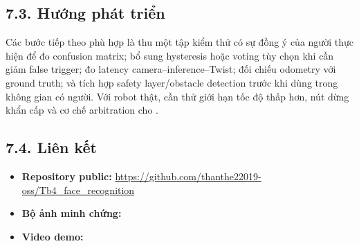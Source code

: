 \subsection*{7.3. Hướng phát triển}

Các bước tiếp theo phù hợp là thu một tập kiểm thử có sự đồng ý của người thực
hiện để đo confusion matrix; bổ sung hysteresis hoặc voting tùy chọn khi cần
giảm false trigger; đo latency camera--inference--Twist; đối chiếu odometry với
ground truth; và tích hợp safety layer/obstacle detection trước khi dùng trong
không gian có người. Với robot thật, cần thử giới hạn tốc độ thấp hơn, nút dừng
khẩn cấp và cơ chế arbitration cho .

\subsection*{7.4. Liên kết}

\begin{itemize}[leftmargin=1cm]
  \item \textbf{Repository public:}
        \url{https://github.com/thanthe22019-oss/Tb4_face_recognition}
  \item \textbf{Bộ ảnh minh chứng:} \evidenceLink
  \item \textbf{Video demo:} 
\end{itemize}



